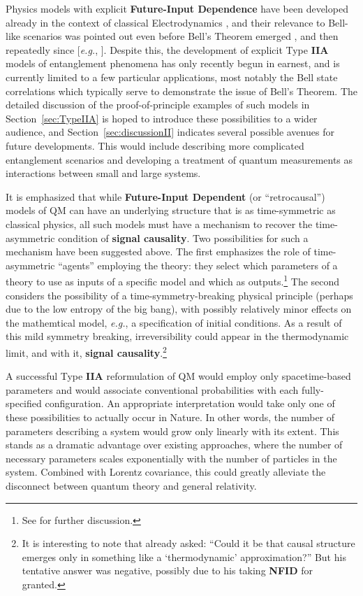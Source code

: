 \documentclass[rmp, aps, preprint, longbibliography]{revtex4-1}
\begin{document}
Physics models with explicit {\bf Future-Input Dependence} have been developed already in the context of classical Electrodynamics \cite{wheeler1945,wheeler1949}, and their relevance to Bell-like scenarios was pointed out even before Bell's Theorem emerged \cite{costa1953}, and then repeatedly since [\emph{e.g.}, \textcite{pegg1982,price1997}].  Despite this, the development of explicit Type {\bf IIA} models of entanglement phenomena has only recently begun in earnest, and is currently limited to a few particular applications, most notably the Bell state correlations which typically serve to demonstrate the issue of Bell's Theorem.  The detailed discussion of the proof-of-principle examples of such models in Section~\ref{sec:TypeIIA} is hoped to introduce these possibilities to a wider audience, and Section~\ref{sec:discussionII} indicates several possible avenues for future developments.  This would include describing more complicated entanglement scenarios and developing a treatment of quantum measurements as interactions between small and large systems. 

It is emphasized that while {\bf Future-Input Dependent} (or ``retrocausal'') models of QM can have an underlying structure that is as time-symmetric as classical physics, all such models must have a mechanism to recover the time-asymmetric condition of {\bf signal causality}.  Two possibilities for such a mechanism have been suggested above.  The first emphasizes the role of time-asymmetric ``agents'' employing the theory: they select which parameters of a theory to use as inputs of a specific model and which as outputs.\footnote{See \textcite{price1997} for further discussion.}  The second considers the possibility of a time-symmetry-breaking physical principle (perhaps due to the low entropy of the big bang), with possibly relatively minor effects on the mathemtical model, \emph{e.g.}, a specification of initial conditions.  As a result of this mild symmetry breaking, irreversibility could appear in the thermodynamic limit, and with it, {\bf signal causality}.\footnote{It is interesting to note that \textcite{bell1990} already asked: ``Could it be that causal structure emerges only in something like a `thermodynamic' approximation?''  But his tentative answer was negative, possibly due to his taking {\bf NFID} for granted.}

A successful Type {\bf IIA} reformulation of QM would employ only spacetime-based parameters and would associate conventional probabilities with each fully-specified configuration.  An appropriate interpretation would take only one of these possibilities to actually occur in Nature.  In other words, the number of parameters describing a system would grow only linearly with its extent.  This stands as a dramatic advantage over existing approaches, where the number of necessary parameters scales exponentially with the number of particles in the system.  Combined with {Lorentz covariance}, this could greatly alleviate the disconnect between quantum theory and general relativity.
\end{document}
